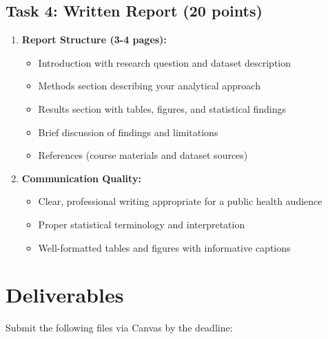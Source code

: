 \documentclass[11pt]{article}
\begin{document}
\subsection{Task 4: Written Report (20 points)}
\begin{enumerate}
\item \textbf{Report Structure (3-4 pages):}
   \begin{itemize}
   \item Introduction with research question and dataset description
   \item Methods section describing your analytical approach
   \item Results section with tables, figures, and statistical findings
   \item Brief discussion of findings and limitations
   \item References (course materials and dataset sources)
   \end{itemize}

\item \textbf{Communication Quality:}
   \begin{itemize}
   \item Clear, professional writing appropriate for a public health audience
   \item Proper statistical terminology and interpretation
   \item Well-formatted tables and figures with informative captions
   \end{itemize}
\end{enumerate}

\section{Deliverables}

Submit the following files via Canvas by the deadline:
\end{document}
